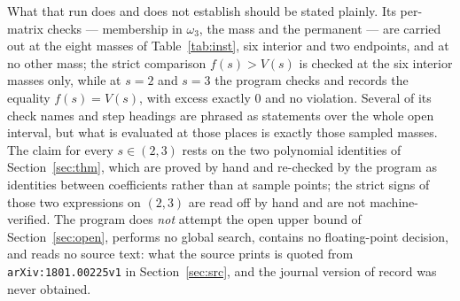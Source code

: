 \documentclass[11pt]{amsart}
\theoremstyle{remark}
\newcommand{\ws}{\omega}
\begin{document}
What that run does and does not establish should be stated plainly. Its per-matrix
checks --- membership in $\ws_3$, the mass and the permanent --- are carried out at the
eight masses of Table~\ref{tab:inst}, six interior and two endpoints, and at no other
mass; the strict comparison $f(s)>V(s)$ is checked at the six interior masses only,
while at $s=2$ and $s=3$ the program checks and records the equality $f(s)=V(s)$, with
excess exactly $0$ and no violation. Several of its check names and step headings are
phrased as statements over the whole open interval, but what is evaluated at those
places is exactly those sampled masses. The claim for every $s\in(2,3)$ rests on the two
polynomial identities of Section~\ref{sec:thm}, which are proved by hand and re-checked
by the program as identities between coefficients rather than at sample points; the
strict signs of those two expressions on $(2,3)$ are read off by hand and are not
machine-verified. The program does \emph{not} attempt the open upper bound of
Section~\ref{sec:open}, performs no global search, contains no floating-point decision,
and reads no source text: what the source prints is quoted from
\texttt{arXiv:1801.00225v1} in Section~\ref{sec:src}, and the journal version of record
was never obtained.
\end{document}
